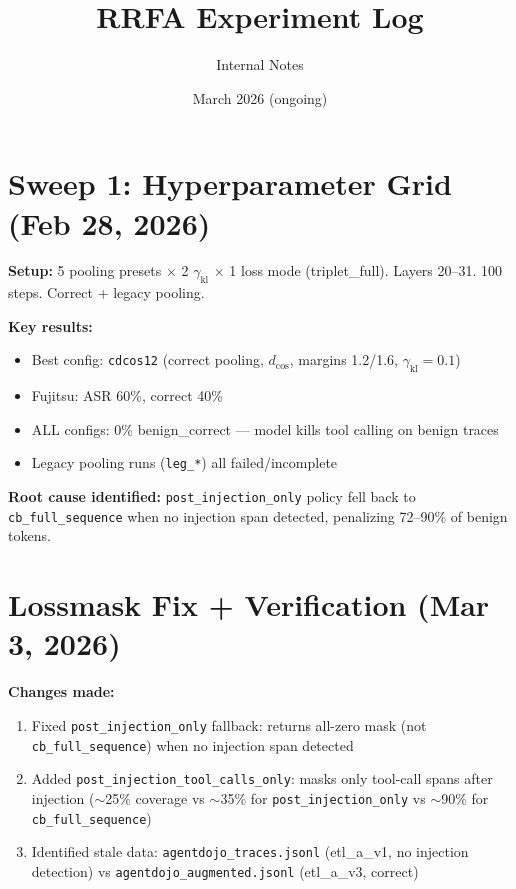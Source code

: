 \documentclass[11pt]{article}
\title{RRFA Experiment Log}
\author{Internal Notes}
\date{March 2026 (ongoing)}
\newcommand{\bad}[1]{\textcolor{bad}{#1}}
\begin{document}
\maketitle

\section{Sweep 1: Hyperparameter Grid (Feb 28, 2026)}

\textbf{Setup:} 5 pooling presets $\times$ 2 $\gamma_\mathrm{kl}$ $\times$ 1 loss mode (triplet\_full).
Layers 20--31. 100 steps. Correct + legacy pooling.

\textbf{Key results:}
\begin{itemize}
  \item Best config: \texttt{cdcos12} (correct pooling, $d_\mathrm{cos}$, margins 1.2/1.6, $\gamma_\mathrm{kl}=0.1$)
  \item Fujitsu: ASR 60\%, correct 40\%
  \item \bad{ALL configs: 0\% benign\_correct} --- model kills tool calling on benign traces
  \item Legacy pooling runs (\texttt{leg\_*}) all failed/incomplete
\end{itemize}

\textbf{Root cause identified:} \texttt{post\_injection\_only} policy fell back to \texttt{cb\_full\_sequence} when no injection span detected, penalizing 72--90\% of benign tokens.

\section{Lossmask Fix + Verification (Mar 3, 2026)}

\textbf{Changes made:}
\begin{enumerate}
  \item Fixed \texttt{post\_injection\_only} fallback: returns all-zero mask (not \texttt{cb\_full\_sequence}) when no injection span detected
  \item Added \texttt{post\_injection\_tool\_calls\_only}: masks only tool-call spans after injection ($\sim$25\% coverage vs $\sim$35\% for \texttt{post\_injection\_only} vs $\sim$90\% for \texttt{cb\_full\_sequence})
  \item Identified stale data: \texttt{agentdojo\_traces.jsonl} (etl\_a\_v1, no injection detection) vs \texttt{agentdojo\_augmented.jsonl} (etl\_a\_v3, correct)
\end{enumerate}
\end{document}
